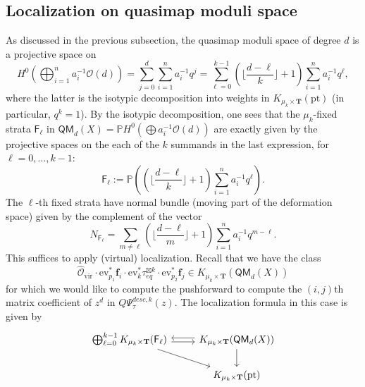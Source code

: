 \documentclass[reqno]{amsart}
\numberwithin{equation}{section}
\numberwithin{equation}{section}
\numberwithin{equation}{section}
\theoremstyle{definition}
\theoremstyle{remark}
\theoremstyle{remark}
\begin{document}
\subsection{Localization on quasimap moduli space}
As discussed in the previous subsection, the quasimap moduli space of degree $d$ is a projective space on
\begin{equation}
    H^0\left( \bigoplus_{i=1}^n a_i^{-1}\mathcal{O}(d)\right) = \sum_{j=0}^d \sum_{i=1}^n a_i^{-1} q^j = \sum_{\ell=0}^{k-1} \left( \lfloor \frac{d-\ell}{k} \rfloor +1 \right) \sum_{i=1}^n a_i^{-1} q^\ell,
\end{equation}
where the latter is the isotypic decomposition into weights in $K_{\mu_k \times \mathbf{T}}(\mathrm{pt})$ (in particular, $q^k = 1$). By the isotypic decomposition, one sees that the $\mu_k$-fixed strata $\mathsf{F}_\ell$ in $\mathsf{QM}_d(X) = \mathbb{P}H^0( \bigoplus a_i^{-1} \mathcal{O}(d))$ are exactly given by the projective spaces on the each of the $k$ summands in the last expression, for $\ell = 0, \dots, k-1$:
\begin{equation}
    \mathsf{F}_{\ell} := \mathbb{P} \left( ( \lfloor \frac{d-\ell}{k} \rfloor +1 )   \sum_{i=1}^n a_i^{-1} q^\ell \right).
\end{equation}
The $\ell$-th fixed strata have normal bundle (moving part of the deformation space) given by the complement of the vector
\begin{equation}
    N_{\mathsf{F}_{\ell}} = \sum_{m \neq \ell} \left( \lfloor \frac{d-\ell}{m} \rfloor +1 \right)  \sum_{i=1}^n a_i^{-1} q^{m-\ell}.
\end{equation}
This suffices to apply (virtual) localization. Recall that we have the class
\begin{equation}
    \hat{\mathcal{O}}_{\mathrm{vir}} \cdot \mathrm{ev}_{p_1}^* \mathbf{f}_{i} \cdot \mathrm{ev}_k^* \tau^{\boxtimes k}_{eq}  \cdot \mathrm{ev}^*_{p_2} \mathbf{f}_j  \in K_{\mu_k \times \mathbf{T}} (\mathsf{QM}_d(X))
\end{equation}
for which we would like to compute the pushforward to compute the $(i,j)$th matrix coefficient of $z^d$ in $Q\Psi_{\tau}^{desc, k} (z)$. The localization formula in this case is given by
\begin{equation}
    \begin{tikzcd}
        \bigoplus_{\ell=0}^{k-1} K_{\mu_k \times \mathbf{T}} (\mathsf{F}_\ell) \arrow[r, yshift=-2] \arrow[rd] & K_{\mu_k \times \mathbf{T}} (\mathsf{QM}_d(X)) \arrow[l,yshift=2] \arrow[d] \\ & K_{\mu_k \times \mathbf{T}} (\mathrm{pt})
    \end{tikzcd}
\end{equation}
\end{document}
